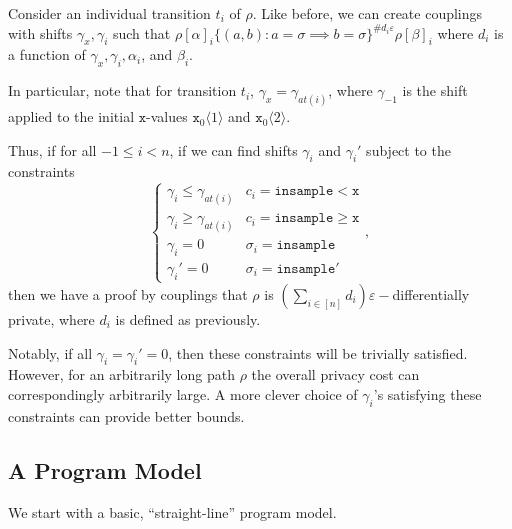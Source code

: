 \documentclass[12pt]{article}
\newcommand{\gguard}[1][x]{\texttt{insample}\geq #1}
\newcommand{\lguard}[1][x]{\texttt{insample} < #1}
\newcommand{\brangle}[1]{\langle #1 \rangle}
\theoremstyle{definition}
\begin{document}
Consider an individual transition $t_i$ of $\rho$. Like before, we can create couplings with shifts $\gamma_x, \gamma_i$ such that $\rho[\alpha]_i \{(a, b): a=\sigma\implies b=\sigma\}^{\#d_i\varepsilon}\rho[\beta]_i$ where $d_i$ is a function of $\gamma_x, \gamma_i, \alpha_i$, and $\beta_i$. 

In particular, note that for transition $t_i$, $\gamma_x = \gamma_{at(i)}$, where $\gamma_{-1}$ is the shift applied to the initial $\texttt{x}$-values $\texttt{x}_0\brangle{1}$ and $\texttt{x}_0\brangle{2}$.

Thus, if for all $-1\leq i<n$, if we can find shifts $\gamma_i$ and $\gamma_i'$ subject to the constraints \[
    \begin{cases}
        \gamma_i \leq \gamma_{at(i)} & c_i = \lguard[\texttt{x}]\\
        \gamma_i\geq \gamma_{at(i)} & c_i = \gguard[\texttt{x}]\\
        \gamma_i = 0 & \sigma_i = \texttt{insample}\\
        \gamma_i' = 0 & \sigma_i = \texttt{insample}'
    \end{cases},
\]
then we have a proof by couplings that $\rho$ is $(\sum_{i\in [n]}d_i)\varepsilon-$differentially private, where $d_i$ is defined as previously. 

Notably, if all $\gamma_i = \gamma_i' = 0$, then these constraints will be trivially satisfied. However, for an arbitrarily long path $\rho$ the overall privacy cost can correspondingly arbitrarily large. A more clever choice of $\gamma_i$'s satisfying these constraints can provide better bounds.  

\subsection{A Program Model}


We start with a basic, ``straight-line'' program model. 
\end{document}
